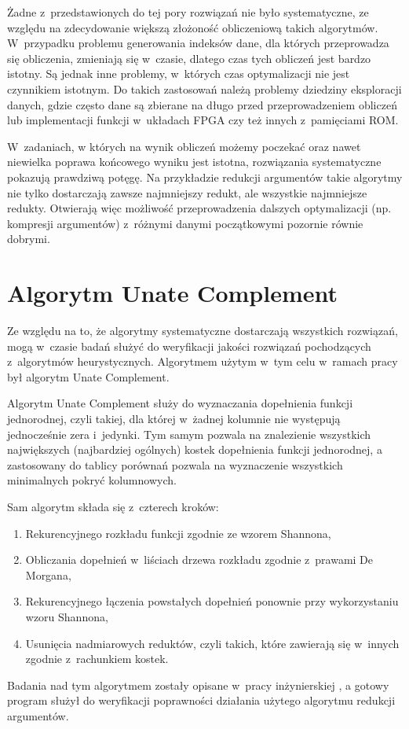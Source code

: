 Żadne z~przedstawionych do tej pory rozwiązań nie było systematyczne,
ze względu na zdecydowanie większą złożoność obliczeniową takich algorytmów.
W~przypadku problemu generowania indeksów dane,
dla których przeprowadza się obliczenia,
zmieniają się w~czasie,
dlatego czas tych obliczeń jest bardzo istotny.
Są jednak inne problemy,
w~których czas optymalizacji nie jest czynnikiem istotnym.
Do takich zastosowań należą problemy dziedziny eksploracji danych,
gdzie często dane są zbierane na długo przed przeprowadzeniem obliczeń
lub implementacji funkcji w~układach FPGA czy też innych z~pamięciami ROM.

W~zadaniach, w których na wynik obliczeń możemy poczekać oraz nawet niewielka poprawa końcowego wyniku jest istotna,
rozwiązania systematyczne pokazują prawdziwą potęgę.
Na przykładzie redukcji argumentów takie algorytmy nie tylko dostarczają zawsze najmniejszy redukt,
ale wszystkie najmniejsze redukty.
Otwierają więc możliwość przeprowadzenia dalszych optymalizacji (np. kompresji argumentów) z~różnymi danymi początkowymi pozornie równie dobrymi.

\section{Algorytm Unate Complement}

Ze względu na to,
że algorytmy systematyczne dostarczają wszystkich rozwiązań,
mogą w~czasie badań służyć do weryfikacji jakości rozwiązań pochodzących z~algorytmów heurystycznych.
Algorytmem użytym w~tym celu w~ramach pracy był algorytm Unate Complement.

Algorytm Unate Complement służy do wyznaczania dopełnienia funkcji jednorodnej,
czyli takiej,
dla której w~żadnej kolumnie nie występują jednocześnie zera i~jedynki.
Tym samym pozwala na znalezienie wszystkich największych (najbardziej ogólnych) kostek dopełnienia funkcji jednorodnej,
a zastosowany do tablicy porównań pozwala na wyznaczenie wszystkich minimalnych pokryć kolumnowych.

Sam algorytm składa się z~czterech kroków:
\begin{enumerate}
\item Rekurencyjnego rozkładu funkcji zgodnie ze wzorem Shannona,
\item Obliczania dopełnień w~liściach drzewa rozkładu zgodnie z~prawami De Morgana,
\item Rekurencyjnego łączenia powstałych dopełnień ponownie przy wykorzystaniu wzoru Shannona,
\item Usunięcia nadmiarowych reduktów,
czyli takich,
które zawierają się w~innych zgodnie z~rachunkiem kostek.
\end{enumerate}
Badania nad tym algorytmem zostały opisane w~pracy inżynierskiej \cite{inzynierka},
a gotowy program służył do weryfikacji poprawności działania użytego algorytmu redukcji argumentów.
